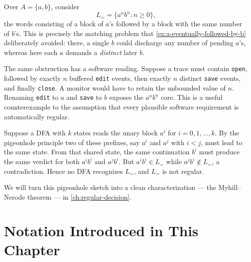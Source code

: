\begin{example}
\label{ex:anbn-non-regular}
Over $A=\{a,b\}$, consider
\[
  L_{=}=\{a^n b^n : n\geq 0\},
\]
the words consisting of a block of $a$'s followed by a block with the
same number of $b$'s.  This is precisely the matching problem that
\cref{ex:a-eventually-followed-by-b} deliberately avoided: there, a
single $b$ could discharge any number of pending $a$'s, whereas here
each $a$ demands a \emph{distinct} later $b$.

The same obstruction has a software reading.  Suppose a trace must
contain \texttt{open}, followed by exactly \(n\) buffered
\texttt{edit} events, then exactly \(n\) distinct \texttt{save} events,
and finally \texttt{close}.  A monitor would have to retain the
unbounded value of \(n\).  Renaming \texttt{edit} to \(a\) and
\texttt{save} to \(b\) exposes the \(a^n b^n\) core.  This is a useful
counterexample to the assumption that every plausible software
requirement is automatically regular.

Suppose a DFA with $k$ states reads the unary block $a^i$ for
$i=0,1,\ldots,k$.  By the pigeonhole principle two of these prefixes,
say $a^i$ and $a^j$ with $i<j$, must lead to the same state.  From that
shared state, the same continuation $b^i$ must produce the same verdict
for both $a^i b^i$ and $a^j b^i$.  But $a^i b^i\in L_{=}$ while
$a^j b^i\notin L_{=}$, a contradiction.  Hence no DFA recognizes
$L_{=}$, and $L_{=}$ is not regular.

We will turn this pigeonhole sketch into a clean characterization ---
the Myhill--Nerode theorem --- in \cref{ch:regular-decision}.
\end{example}

\section*{Notation Introduced in This Chapter}

